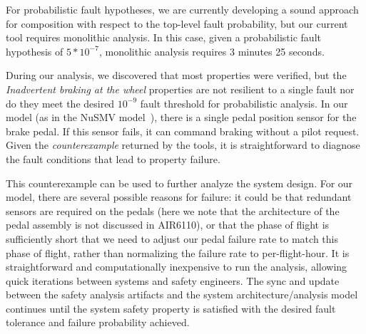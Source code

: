 For probabilistic fault hypotheses, we are currently developing a sound approach for composition with respect to the top-level fault probability, but our current tool requires monolithic analysis.  In this case, given a probabilistic fault hypothesis of $5*10^{-7}$, monolithic analysis requires 3 minutes 25 seconds.

During our analysis, we discovered that most properties were verified, but the \textit{Inadvertent braking at the wheel} properties are not resilient to a single fault nor do they meet the desired $10^{-9}$ fault threshold for probabilistic analysis.  In our model (as in the NuSMV model~\cite{DBLP:conf/cav/BozzanoCPJKPRT15}), there is a single pedal position sensor for the brake pedal.  If this sensor fails, it can command braking without a pilot request.  Given the {\em counterexample} returned by the tools, it is straightforward to diagnose the fault conditions that lead to property failure.

This counterexample can be used to further analyze the system design.  For our model, there are several possible reasons for failure: it could be that redundant sensors are required on the pedals (here we note that the architecture of the pedal assembly is not discussed in AIR6110), or that the phase of flight is sufficiently short that we need to adjust our pedal failure rate to match this phase of flight, rather than normalizing the failure rate to per-flight-hour.  It is straightforward and computationally inexpensive to run the analysis, allowing quick iterations between systems and safety engineers. 
The sync and update between the safety analysis artifacts and the system architecture/analysis model continues until the system safety property is satisfied with the desired fault tolerance and failure probability achieved.